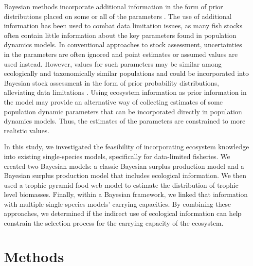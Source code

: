 \documentclass[oneside,12pt,final]{sty/ucthesis-CA2012}
\let\cite\citep                             %
\begin{document}
\begin{mainmatter}
Bayesian methods incorporate additional information in the form of prior distributions placed on some or all of the parameters \cite{mcallister1998bayesian}. The use of additional information has been used to combat data limitation issues, as many fish stocks often contain little information about the key parameters found in population dynamics models. In conventional approaches to stock assessment, uncertainties in the parameters are often ignored and point estimates or assumed values are used instead. However, values for such parameters may be similar among ecologically and taxonomically similar populations and could be incorporated into Bayesian stock assessment in the form of prior probability distributions, alleviating data limitations \cite{mcallister1998bayesian}. Using ecosystem information as prior information in the model may provide an alternative way of collecting estimates of some population dynamic parameters that can be incorporated directly in population dynamics models. Thus, the estimates of the parameters are constrained to more realistic values. 

\vspace{5mm}

In this study, we investigated the feasibility of incorporating ecosystem knowledge into existing single-species models, specifically for data-limited fisheries. We created two Bayesian models: a classic Bayesian surplus production model and a Bayesian surplus production model that includes ecological information. We then used a trophic pyramid food web model to estimate the distribution of trophic level biomasses. Finally, within a Bayesian framework, we linked that information with multiple single-species models’ carrying capacities. By combining these approaches, we determined if the indirect use of ecological information can help constrain the selection process for the carrying capacity of the ecosystem.  


\section{Methods}

\end{mainmatter}
\end{document}
